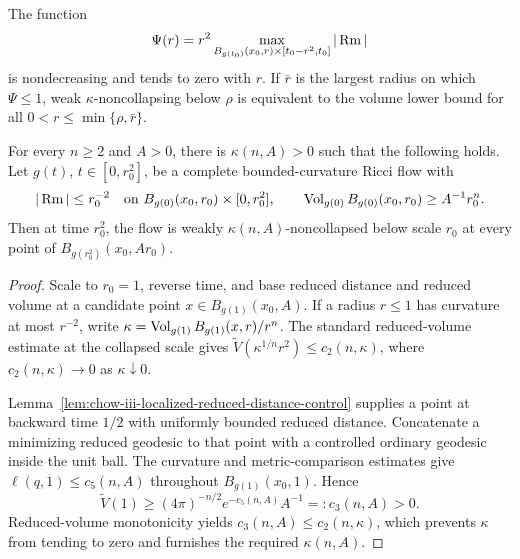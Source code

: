 \begin{remark}
\label{rem:chow-iii-largest-curvature-controlled-scale}
The function
\[
 \Psi(r)=r^2\max_{B_{g(t_0)}(x_0,r)\times[t_0-r^2,t_0]}|\operatorname{Rm}|
\]
is nondecreasing and tends to zero with \(r\).  If \(\bar r\) is the largest
radius on which \(\Psi\le1\), weak \(\kappa\)-noncollapsing below \(\rho\) is
equivalent to the volume lower bound for all
\(0<r\le\min\{\rho,\bar r\}\).
\end{remark}

\begin{theorem}
\label{thm:chow-iii-localized-no-local-collapsing}
For every \(n\ge2\) and \(A>0\), there is \(\kappa(n,A)>0\) such that the
following holds.  Let \(g(t)\), \(t\in[0,r_0^2]\), be a complete
bounded-curvature Ricci flow with
\[
 |\operatorname{Rm}|\le r_0^{-2}\quad\text{on }B_{g(0)}(x_0,r_0)\times[0,r_0^2],
 \qquad \operatorname{Vol}_{g(0)}B_{g(0)}(x_0,r_0)\ge A^{-1}r_0^n.
\]
Then at time \(r_0^2\), the flow is weakly \(\kappa(n,A)\)-noncollapsed below
scale \(r_0\) at every point of \(B_{g(r_0^2)}(x_0,Ar_0)\).
\end{theorem}
\begin{proof}
Scale to \(r_0=1\), reverse time, and base reduced distance and reduced volume
at a candidate point \(x\in B_{g(1)}(x_0,A)\).  If a radius \(r\le1\) has
curvature at most \(r^{-2}\), write
\(\kappa=\operatorname{Vol}_{g(1)}B_{g(1)}(x,r)/r^n\).  The standard reduced-volume estimate
at the collapsed scale gives
\(\widetilde V(\kappa^{1/n}r^2)\le c_2(n,\kappa)\), where
\(c_2(n,\kappa)\to0\) as \(\kappa\downarrow0\).

Lemma~\ref{lem:chow-iii-localized-reduced-distance-control} supplies a point
at backward time \(1/2\) with uniformly bounded reduced distance.  Concatenate
a minimizing reduced geodesic to that point with a controlled ordinary
geodesic inside the unit ball.  The curvature and metric-comparison estimates
give \(\ell(q,1)\le c_5(n,A)\) throughout \(B_{g(1)}(x_0,1)\).  Hence
\[
 \widetilde V(1)\ge(4\pi)^{-n/2}e^{-c_5(n,A)}A^{-1}=:c_3(n,A)>0.
\]
Reduced-volume monotonicity yields
\(c_3(n,A)\le c_2(n,\kappa)\), which prevents \(\kappa\) from tending to zero
and furnishes the required \(\kappa(n,A)\).
\end{proof}

